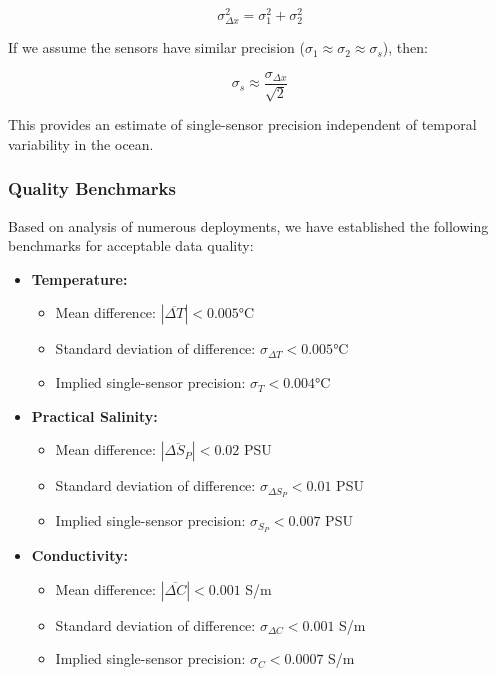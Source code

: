 \begin{equation}
\sigma_{\Delta x}^2 = \sigma_1^2 + \sigma_2^2
\end{equation}

If we assume the sensors have similar precision ($\sigma_1 \approx \sigma_2 \approx \sigma_s$), then:

\begin{equation}
\sigma_s \approx \frac{\sigma_{\Delta x}}{\sqrt{2}}
\end{equation}

This provides an estimate of single-sensor precision independent of temporal variability in the ocean.

\subsubsection{Quality Benchmarks}

Based on analysis of numerous deployments, we have established the following benchmarks for acceptable data quality:

\begin{itemize}
    \item \textbf{Temperature:}
    \begin{itemize}
        \item Mean difference: $|\overline{\Delta T}| < 0.005$°C
        \item Standard deviation of difference: $\sigma_{\Delta T} < 0.005$°C
        \item Implied single-sensor precision: $\sigma_T < 0.004$°C
    \end{itemize}
    
    \item \textbf{Practical Salinity:}
    \begin{itemize}
        \item Mean difference: $|\overline{\Delta S_P}| < 0.02$ PSU
        \item Standard deviation of difference: $\sigma_{\Delta S_P} < 0.01$ PSU
        \item Implied single-sensor precision: $\sigma_{S_P} < 0.007$ PSU
    \end{itemize}
    
    \item \textbf{Conductivity:}
    \begin{itemize}
        \item Mean difference: $|\overline{\Delta C}| < 0.001$ S/m
        \item Standard deviation of difference: $\sigma_{\Delta C} < 0.001$ S/m
        \item Implied single-sensor precision: $\sigma_C < 0.0007$ S/m
    \end{itemize}
\end{itemize}


